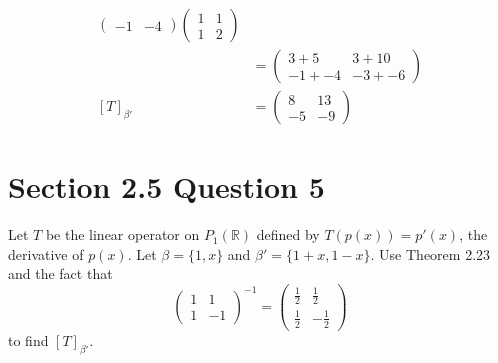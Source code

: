 \documentclass[13pt]{article}
\begin{document}
\begin{align*}
\begin{pmatrix}
                           -1 & -4
                         \end{pmatrix}
                         \begin{pmatrix}
                           1 & 1 \\
                           1 & 2
                         \end{pmatrix} \\
                       &=
                         \begin{pmatrix}
                           3 + 5 & 3 + 10 \\
                           -1 + -4 & -3 + -6
                         \end{pmatrix} \\
          [T]_{\beta'}  &= \begin{pmatrix}
                             8 & 13 \\
                             -5 & -9
                           \end{pmatrix}
        \end{align*}


        \newpage
        \section*{Section 2.5 Question 5}
        Let $T$ be the linear operator on $P_1(\mathbb{R})$ defined by $T(p(x)) = p'(x)$, the derivative of $p(x)$. Let $\beta = \{ 1, x \}$ and $\beta' = \{ 1 + x, 1 - x \}$. Use Theorem 2.23 and the fact that
        \[
          \begin{pmatrix}
            1 & 1 \\
            1 & -1
          \end{pmatrix}^{-1}
          =
          \begin{pmatrix}
            \frac{1}{2} & \frac{1}{2} \\
            \frac{1}{2} & -\frac{1}{2}
          \end{pmatrix}\]
        to find $[T]_{\beta'}$.
\end{document}
